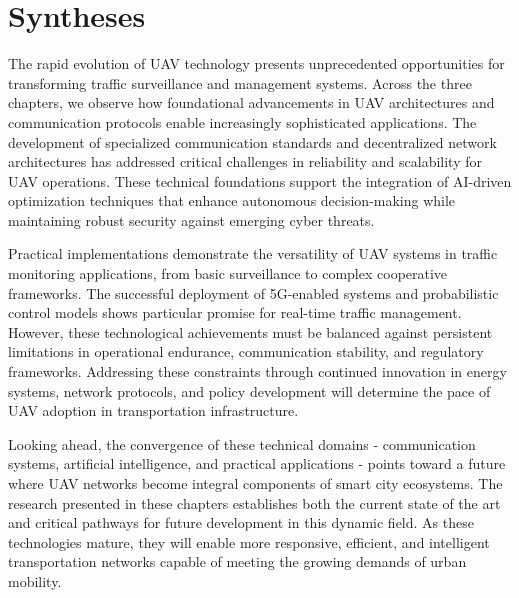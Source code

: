 \chapter*{Syntheses}

The rapid evolution of UAV technology presents unprecedented opportunities for transforming traffic surveillance and management systems. Across the three chapters, we observe how foundational advancements in UAV architectures and communication protocols enable increasingly sophisticated applications. The development of specialized communication standards and decentralized network architectures has addressed critical challenges in reliability and scalability for UAV operations. These technical foundations support the integration of AI-driven optimization techniques that enhance autonomous decision-making while maintaining robust security against emerging cyber threats.

\vspace{0.5cm}

Practical implementations demonstrate the versatility of UAV systems in traffic monitoring applications, from basic surveillance to complex cooperative frameworks. The successful deployment of 5G-enabled systems and probabilistic control models shows particular promise for real-time traffic management. However, these technological achievements must be balanced against persistent limitations in operational endurance, communication stability, and regulatory frameworks. Addressing these constraints through continued innovation in energy systems, network protocols, and policy development will determine the pace of UAV adoption in transportation infrastructure.

\vspace{0.5cm}

Looking ahead, the convergence of these technical domains - communication systems, artificial intelligence, and practical applications - points toward a future where UAV networks become integral components of smart city ecosystems. The research presented in these chapters establishes both the current state of the art and critical pathways for future development in this dynamic field. As these technologies mature, they will enable more responsive, efficient, and intelligent transportation networks capable of meeting the growing demands of urban mobility.